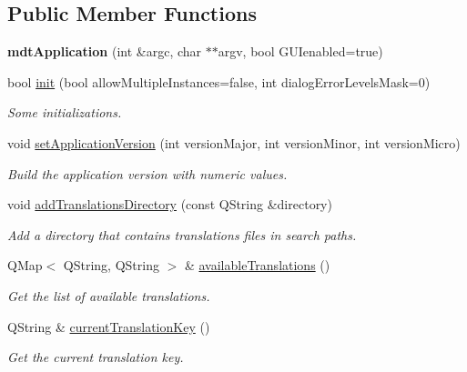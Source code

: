 \subsection*{Public Member Functions}
\begin{DoxyCompactItemize}
\item 
\hypertarget{classmdt_application_ab6268414770ee9239c83677c15a67f75}{
{\bfseries mdtApplication} (int \&argc, char $\ast$$\ast$argv, bool GUIenabled=true)}
\label{classmdt_application_ab6268414770ee9239c83677c15a67f75}

\item 
bool \hyperlink{classmdt_application_a3b8798416e730f85e419566442adb77b}{init} (bool allowMultipleInstances=false, int dialogErrorLevelsMask=0)
\begin{DoxyCompactList}\small\item\em Some initializations. \end{DoxyCompactList}\item 
void \hyperlink{classmdt_application_a79dbb5f3d889d7cd9b8909a4eb8bcce1}{setApplicationVersion} (int versionMajor, int versionMinor, int versionMicro)
\begin{DoxyCompactList}\small\item\em Build the application version with numeric values. \end{DoxyCompactList}\item 
void \hyperlink{classmdt_application_ab5279a8c25923ab4c570670b8a41d599}{addTranslationsDirectory} (const QString \&directory)
\begin{DoxyCompactList}\small\item\em Add a directory that contains translations files in search paths. \end{DoxyCompactList}\item 
QMap$<$ QString, QString $>$ \& \hyperlink{classmdt_application_a9ce5b5c3ca36a76ad0acc3913ce8f89a}{availableTranslations} ()
\begin{DoxyCompactList}\small\item\em Get the list of available translations. \end{DoxyCompactList}\item 
QString \& \hyperlink{classmdt_application_a531e64266be58b3a10608b21ae6afedb}{currentTranslationKey} ()
\begin{DoxyCompactList}\small\item\em Get the current translation key. \end{DoxyCompactList}\item 

\end{DoxyCompactItemize}
